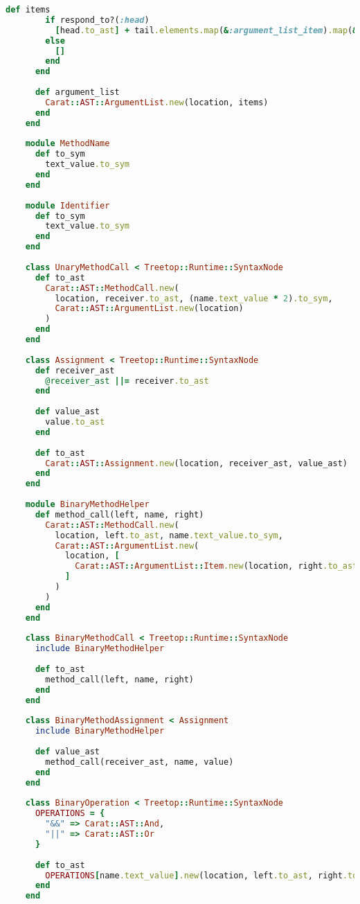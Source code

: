 \begin{lstlisting}[title={\small\Helvetica parser/nodes.rb},language=Ruby]
      def items
        if respond_to?(:head)
          [head.to_ast] + tail.elements.map(&:argument_list_item).map(&:to_ast)
        else
          []
        end
      end
      
      def argument_list
        Carat::AST::ArgumentList.new(location, items)
      end
    end
    
    module MethodName
      def to_sym
        text_value.to_sym
      end
    end
    
    module Identifier
      def to_sym
        text_value.to_sym
      end
    end
    
    class UnaryMethodCall < Treetop::Runtime::SyntaxNode
      def to_ast
        Carat::AST::MethodCall.new(
          location, receiver.to_ast, (name.text_value * 2).to_sym,
          Carat::AST::ArgumentList.new(location)
        )
      end
    end
    
    class Assignment < Treetop::Runtime::SyntaxNode
      def receiver_ast
        @receiver_ast ||= receiver.to_ast
      end
      
      def value_ast
        value.to_ast
      end
      
      def to_ast
        Carat::AST::Assignment.new(location, receiver_ast, value_ast)
      end
    end
    
    module BinaryMethodHelper
      def method_call(left, name, right)
        Carat::AST::MethodCall.new(
          location, left.to_ast, name.text_value.to_sym,
          Carat::AST::ArgumentList.new(
            location, [
              Carat::AST::ArgumentList::Item.new(location, right.to_ast)
            ]
          )
        )
      end
    end
    
    class BinaryMethodCall < Treetop::Runtime::SyntaxNode
      include BinaryMethodHelper
      
      def to_ast
        method_call(left, name, right)
      end
    end
    
    class BinaryMethodAssignment < Assignment
      include BinaryMethodHelper
      
      def value_ast
        method_call(receiver_ast, name, value)
      end
    end
    
    class BinaryOperation < Treetop::Runtime::SyntaxNode
      OPERATIONS = {
        "&&" => Carat::AST::And,
        "||" => Carat::AST::Or
      }
      
      def to_ast
        OPERATIONS[name.text_value].new(location, left.to_ast, right.to_ast)
      end
    end
    

\end{lstlisting}
